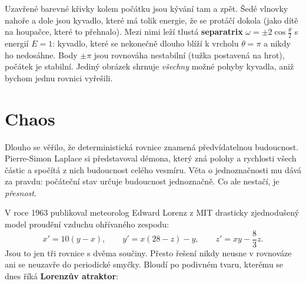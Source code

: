 \begin{center}
\end{center}

Uzavřené barevné křivky kolem počátku jsou kývání tam a zpět. Šedé vlnovky nahoře a dole jsou kyvadlo, které má tolik energie, že se protáčí dokola (jako dítě na houpačce, které to přehnalo). Mezi nimi leží tlustá \textbf{separatrix} $\omega = \pm2\cos\frac{\theta}{2}$ s energií $E = 1$: kyvadlo, které se nekonečně dlouho blíží k vrcholu $\theta = \pi$ a nikdy ho nedosáhne. Body $\pm\pi$ jsou rovnováha nestabilní (tužka postavená na hrot), počátek je stabilní. Jediný obrázek shrnuje \textit{všechny} možné pohyby kyvadla, aniž bychom jednu rovnici vyřešili.

\section{Chaos}

Dlouho se věřilo, že deterministická rovnice znamená předvídatelnou budoucnost. Pierre-Simon Laplace si představoval démona, který zná polohy a rychlosti všech částic a spočítá z nich budoucnost celého vesmíru. Věta o jednoznačnosti mu dává za pravdu: počáteční stav určuje budoucnost jednoznačně. Co ale nestačí, je \textit{přesnost}.

V roce 1963 publikoval meteorolog Edward Lorenz z MIT drasticky zjednodušený model proudění vzduchu ohřívaného zespodu:
\begin{equation*}
  x' = 10(y - x),\qquad y' = x(28 - z) - y,\qquad z' = xy - \frac{8}{3}z.
\end{equation*}
Jsou to jen tři rovnice s dvěma součiny. Přesto řešení nikdy neusne v rovnováze ani se neuzavře do periodické smyčky. Bloudí po podivném tvaru, kterému se dnes říká \textbf{Lorenzův atraktor}:

